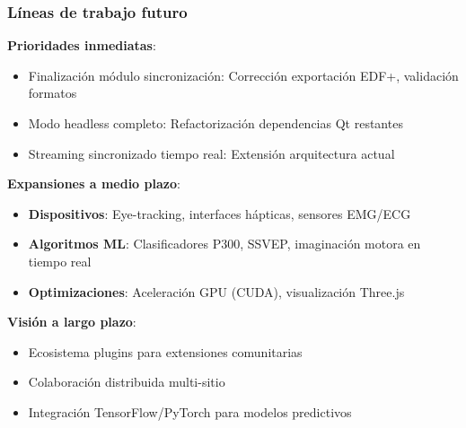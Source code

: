 \documentclass[10pt,thmsa]{beamer}
\theoremstyle{plain}
\begin{document}
\begin{frame}
\frametitle{Líneas de trabajo futuro}

\textbf{Prioridades inmediatas}:
\begin{itemize}
\item Finalización módulo sincronización: Corrección exportación EDF+, validación formatos
\item Modo headless completo: Refactorización dependencias Qt restantes
\item Streaming sincronizado tiempo real: Extensión arquitectura actual
\end{itemize}

\vspace{1em}

\textbf{Expansiones a medio plazo}:
\begin{itemize}
\item \textbf{Dispositivos}: Eye-tracking, interfaces hápticas, sensores EMG/ECG
\item \textbf{Algoritmos ML}: Clasificadores P300, SSVEP, imaginación motora en tiempo real
\item \textbf{Optimizaciones}: Aceleración GPU (CUDA), visualización Three.js
\end{itemize}

\vspace{1em}

\textbf{Visión a largo plazo}:
\begin{itemize}
\item Ecosistema plugins para extensiones comunitarias
\item Colaboración distribuida multi-sitio
\item Integración TensorFlow/PyTorch para modelos predictivos
\end{itemize}

\end{frame}

\begin{frame}[plain, label=final]

\titlepage

\end{frame}
\end{document}
